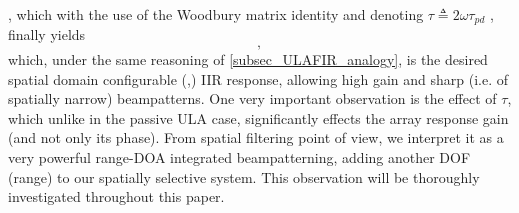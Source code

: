     , which with the use of the Woodbury matrix identity \cite{woodbury1950inverting} and denoting $\tau\triangleq2\omega\tau_{pd}$ , finally yields
    \begin{equation}
    \label{eqn:GeneralFeedbackTransferFunction}
    ,
    \end{equation}
    which, under the same reasoning of \ref{subsec_ULAFIR_analogy}, is the desired spatial domain configurable (\vecnot{\alpha},\vecnot{\beta}) IIR response, allowing high gain and sharp (i.e. of spatially narrow) beampatterns.
    One very important observation is the effect of $\tau$, which unlike in the passive ULA case, significantly effects the array response gain (and not only its phase).
    From spatial filtering point of view, we interpret it as a very powerful range-DOA integrated beampatterning, adding another DOF (range) to our spatially selective system.
    This observation will be thoroughly investigated throughout this paper.
\fi